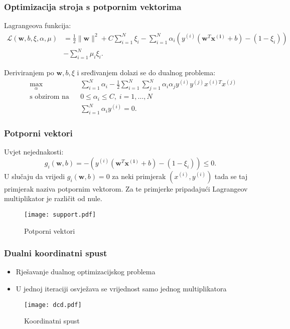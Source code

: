 \documentclass[utf8]{beamer}
\begin{document}
\begin{frame}
\frametitle{Optimizacija stroja s potpornim vektorima}
Lagrangeova funkcija:
\begin{align*}
  \mathcal{L}(\mathbf{w}, b, \xi,\alpha, \mu) 
  &= \frac{1}{2}\|\mathbf{w}\|^2 + C\sum_{i=1}^{N} \xi_i
  - \sum_{i=1}^{N} \alpha_i(y^{(i)}(\mathbf{w}^T\mathbf{x^{(i)}} + b) - (1 - \xi_i)) \\
  &- \sum_{i=1}^{N} \mu_i\xi_i.
\end{align*}

Deriviranjem po $\mathbf{w}, b, \xi$ i sređivanjem dolazi se do dualnog problema:
\begin{equation*}
\begin{aligned}
& \underset{\alpha}{\text{max}}
& & \sum_{i=1}^{N} \alpha_i - 
  \frac{1}{2}\sum_{i=1}^{N}\sum_{j=1}^{N} \alpha_i\alpha_jy^{(i)}y^{(j)}x^{(i)T}x^{(j)}\\
& \text{s obzirom na}
& & 0 \leq \alpha_i \leq C, \; i = 1, \ldots, N \\
&&& \sum_{i=1}^{N} \alpha_iy^{(i)} = 0.
\end{aligned}
\end{equation*}
\end{frame}

\begin{frame}
\frametitle{Potporni vektori}
Uvjet nejednakosti: 
\begin{equation*}
  g_i(\mathbf{w}, b) = - (y^{(i)}(\mathbf{w}^T\mathbf{x^{(i)}} + b) - (1 - \xi_i)) \leq 0.
\end{equation*}
U slučaju da vrijedi $g_i(\mathbf{w}, b) = 0$ za neki primjerak $(x^{(i)}, y^{(i)})$ tada
se taj primjerak naziva \alert{potpornim vektorom}. Za te primjerke pripadajući Lagrangeov multiplikator je različit od nule.

\begin{figure}
\texttt{[image: support.pdf]}
\caption{Potporni vektori}
\end{figure}
\end{frame}

\begin{frame}
\frametitle{Dualni koordinatni spust}
\begin{itemize}
\item Rješavanje dualnog optimizacijskog problema
\item U jednoj iteraciji osvježava se vrijednost samo jednog multiplikatora
\end{itemize}

\begin{figure}
\texttt{[image: dcd.pdf]}
\caption{Koordinatni spust}
\end{figure}
\end{frame}
\end{document}
